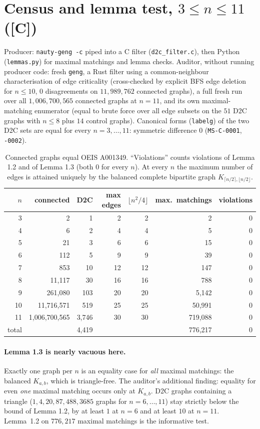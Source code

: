\documentclass[10pt]{article}
\newcommand{\tier}[1]{\textsf{[#1]}}
\newcommand{\tC}{\tier{C}}
\begin{document}
\section{Census and lemma test, $3\le n\le 11$ (\tC{})}\label{sec:res}
Producer: \texttt{nauty-geng -c} piped into a C filter (\texttt{d2c\_filter.c}), then Python (\texttt{lemmas.py}) for maximal matchings and lemma checks. Auditor, without running producer code: fresh \texttt{geng}, a Rust filter using a common-neighbour characterisation of edge criticality (cross-checked by explicit BFS edge deletion for $n\le10$, $0$ disagreements on $11{,}989{,}762$ connected graphs), a full fresh run over all $1{,}006{,}700{,}565$ connected graphs at $n=11$, and its own maximal-matching enumerator (equal to brute force over all edge subsets on the $51$ D2C graphs with $n\le8$ plus $14$ control graphs). Canonical forms (\texttt{labelg}) of the two D2C sets are equal for every $n=3,\dots,11$: symmetric difference $0$ (\texttt{MS-C-0001}, \texttt{-0002}).
\begin{table}[h]\centering\small
\begin{tabular}{@{}rrrrrrr@{}}\toprule
$n$ & connected & D2C & max edges & $\lfloor n^2/4\rfloor$ & max.\ matchings & violations\\ \midrule
3 & 2 & 1 & 2 & 2 & 2 & 0\\
4 & 6 & 2 & 4 & 4 & 5 & 0\\
5 & 21 & 3 & 6 & 6 & 15 & 0\\
6 & 112 & 5 & 9 & 9 & 39 & 0\\
7 & 853 & 10 & 12 & 12 & 147 & 0\\
8 & 11,117 & 30 & 16 & 16 & 788 & 0\\
9 & 261,080 & 103 & 20 & 20 & 5,142 & 0\\
10 & 11,716,571 & 519 & 25 & 25 & 50,991 & 0\\
11 & 1,006,700,565 & 3,746 & 30 & 30 & 719,088 & 0\\ \midrule
total & & 4,419 & & & 776,217 & 0\\ \bottomrule
\end{tabular}
\caption{Connected graphs equal OEIS A001349. ``Violations'' counts violations of Lemma 1.2 and of Lemma 1.3 (both $0$ for every $n$). At every $n$ the maximum number of edges is attained uniquely by the balanced complete bipartite graph $K_{\lceil n/2\rceil,\lfloor n/2\rfloor}$.}\label{tab:r}
\end{table}

\paragraph{Lemma 1.3 is nearly vacuous here.} Exactly one graph per $n$ is an equality case for \emph{all} maximal matchings: the balanced $K_{a,b}$, which is triangle-free. The auditor's additional finding: equality for even \emph{one} maximal matching occurs only at $K_{a,b}$. D2C graphs containing a triangle ($1,4,20,87,488,3685$ graphs for $n=6,\dots,11$) stay strictly below the bound of Lemma 1.2, by at least $1$ at $n=6$ and at least $10$ at $n=11$. Lemma~1.2 on $776{,}217$ maximal matchings is the informative test.
\end{document}
